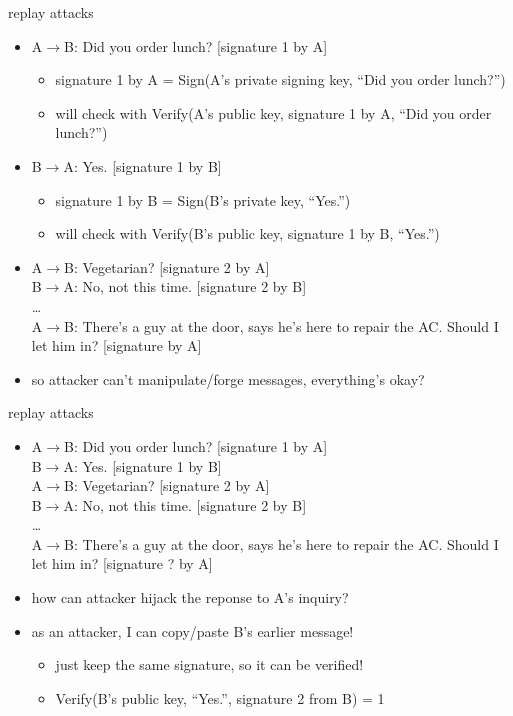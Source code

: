 \begin{frame}{replay attacks}
    \begin{itemize}
    \item A$\rightarrow$B: Did you order lunch? [signature 1 by A]
        \begin{itemize}
            \item signature 1 by A = Sign(A's private signing key, ``Did you order lunch?'')
            \item will check with Verify(A's public key, signature 1 by A, ``Did you order lunch?'')
        \end{itemize}
    \item B$\rightarrow$A: Yes. [signature 1 by B]  
        \begin{itemize}
            \item signature 1 by B = Sign(B's private key, ``Yes.'')
            \item will check with Verify(B's public key, signature 1 by B, ``Yes.'')
        \end{itemize}
    \item  A$\rightarrow$B: Vegetarian? [signature 2 by A]  \\
     B$\rightarrow$A: No, not this time. [signature 2 by B]  \\ \ldots \\
     A$\rightarrow$B: There's a guy at the door, says he's here to repair the AC. Should I let him in? [signature by A]
    \vspace{.5cm}
    \item so attacker can't manipulate/forge messages, everything's okay?
    \end{itemize}
\end{frame}

\begin{frame}{replay attacks}
    \begin{itemize}
    \item A$\rightarrow$B: Did you order lunch? [signature 1 by A] \\
          B$\rightarrow$A: Yes. [signature 1 by B]  \\
          A$\rightarrow$B: Vegetarian? [signature 2 by A] \\
          B$\rightarrow$A: No, not this time. [signature 2 by B] \\
          \ldots \\
          A$\rightarrow$B: There's a guy at the door, says he's here to repair the AC. Should I let him in? [signature ? by A]
    \item how can attacker hijack the reponse to A's inquiry?
    \vspace{.5cm}
    \item<2-> as an attacker, I can copy/paste B's earlier message!
        \begin{itemize}
        \item just keep the same signature, so it can be verified!
        \item Verify(B's public key, ``Yes.'', signature 2 from B) = 1
        \end{itemize}
    \end{itemize}
\end{frame}


